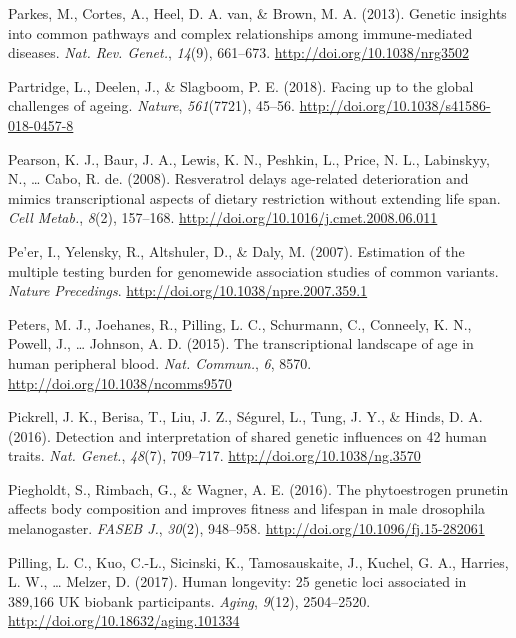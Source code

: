 \documentclass[12pt,twoside]{unicam}
\begin{document}
\begin{cslreferences}
\leavevmode\hypertarget{ref-Parkes2013}{}%
Parkes, M., Cortes, A., Heel, D. A. van, \& Brown, M. A. (2013). Genetic insights into common pathways and complex relationships among immune-mediated diseases. \emph{Nat. Rev. Genet.}, \emph{14}(9), 661--673. \url{http://doi.org/10.1038/nrg3502}

\leavevmode\hypertarget{ref-Partridge2018}{}%
Partridge, L., Deelen, J., \& Slagboom, P. E. (2018). Facing up to the global challenges of ageing. \emph{Nature}, \emph{561}(7721), 45--56. \url{http://doi.org/10.1038/s41586-018-0457-8}

\leavevmode\hypertarget{ref-Pearson2008}{}%
Pearson, K. J., Baur, J. A., Lewis, K. N., Peshkin, L., Price, N. L., Labinskyy, N., \ldots{} Cabo, R. de. (2008). Resveratrol delays age-related deterioration and mimics transcriptional aspects of dietary restriction without extending life span. \emph{Cell Metab.}, \emph{8}(2), 157--168. \url{http://doi.org/10.1016/j.cmet.2008.06.011}

\leavevmode\hypertarget{ref-Peer2007}{}%
Pe'er, I., Yelensky, R., Altshuler, D., \& Daly, M. (2007). Estimation of the multiple testing burden for genomewide association studies of common variants. \emph{Nature Precedings}. \url{http://doi.org/10.1038/npre.2007.359.1}

\leavevmode\hypertarget{ref-Peters2015}{}%
Peters, M. J., Joehanes, R., Pilling, L. C., Schurmann, C., Conneely, K. N., Powell, J., \ldots{} Johnson, A. D. (2015). The transcriptional landscape of age in human peripheral blood. \emph{Nat. Commun.}, \emph{6}, 8570. \url{http://doi.org/10.1038/ncomms9570}

\leavevmode\hypertarget{ref-Pickrell2016}{}%
Pickrell, J. K., Berisa, T., Liu, J. Z., Ségurel, L., Tung, J. Y., \& Hinds, D. A. (2016). Detection and interpretation of shared genetic influences on 42 human traits. \emph{Nat. Genet.}, \emph{48}(7), 709--717. \url{http://doi.org/10.1038/ng.3570}

\leavevmode\hypertarget{ref-Piegholdt2016}{}%
Piegholdt, S., Rimbach, G., \& Wagner, A. E. (2016). The phytoestrogen prunetin affects body composition and improves fitness and lifespan in male drosophila melanogaster. \emph{FASEB J.}, \emph{30}(2), 948--958. \url{http://doi.org/10.1096/fj.15-282061}

\leavevmode\hypertarget{ref-Pilling2017}{}%
Pilling, L. C., Kuo, C.-L., Sicinski, K., Tamosauskaite, J., Kuchel, G. A., Harries, L. W., \ldots{} Melzer, D. (2017). Human longevity: 25 genetic loci associated in 389,166 UK biobank participants. \emph{Aging}, \emph{9}(12), 2504--2520. \url{http://doi.org/10.18632/aging.101334}


\end{cslreferences}
\end{document}
